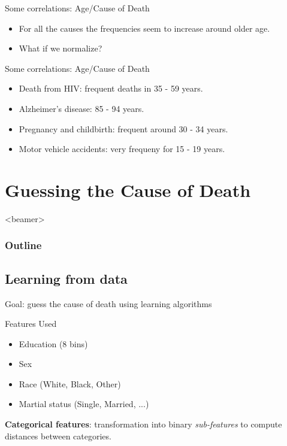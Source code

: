 \documentclass[xcolor=table]{beamer}
\begin{document}
  	 \begin{frame}{Some correlations: Age/Cause of Death}
     \begin{itemize}
			\item For all the causes the frequencies seem to increase around older age. 
			\item What if we normalize?
		\end{itemize}
     	\begin{center}
		 \end{center}
     \end{frame}
  	
  	\begin{frame}{Some correlations: Age/Cause of Death}
     \begin{itemize}
			\item Death from HIV:  frequent deaths in 35 - 59 years.
			\item Alzheimer's disease: 85 - 94 years.
			\item Pregnancy and childbirth: frequent around 30 - 34 years.
			\item Motor vehicle accidents: very frequeny for 15 - 19 years.

		\end{itemize}
     	\begin{center}
		 \end{center}
     \end{frame}

\section{Guessing the Cause of Death}
     \begin{frame}<beamer>
     \frametitle{Outline}
     \tableofcontents[currentsection]
     \end{frame}
     
\subsection{Learning from data}
\begin{frame}
  Goal: guess the cause of death using learning algorithms
\end{frame}

\begin{frame}{Features Used}
\begin{itemize}
  \item Education (8 bins)
  \item Sex
  \item Race (White, Black, Other)
  \item Martial status (Single, Married, ...)
\end{itemize}

\bigskip

\textbf{Categorical features}: transformation into binary \textit{sub-features} to compute distances between categories.
\end{frame}
\end{document}
